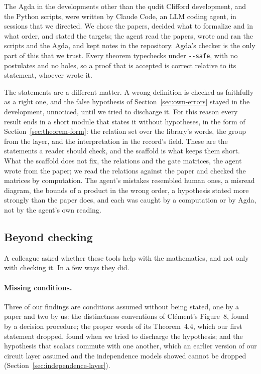 The Agda in the developments other than the qudit Clifford development,
and the Python scripts, were written by Claude Code, an LLM coding
agent, in sessions that we directed. We chose the papers, decided what
to formalize and in what order, and stated the targets; the agent read
the papers, wrote and ran the scripts and the Agda, and kept notes in
the repository. Agda's checker is the only part of this that we trust.
Every theorem typechecks under \texttt{-{}-safe}, with no postulates
and no holes, so a proof that is accepted is correct relative to its
statement, whoever wrote it.

The statements are a different matter. A wrong definition is checked
as faithfully as a right one, and the false hypothesis of
Section~\ref{sec:own-errors} stayed in the development, unnoticed, until
we tried to discharge it. For this reason every result ends in a short
module that states it without hypotheses, in the form of
Section~\ref{sec:theorem-form}: the relation set over the library's
words, the group from the layer, and the interpretation in the
record's field. These are the statements a reader should check, and
the scaffold is what keeps them short. What the scaffold does not fix,
the relations and the gate matrices, the agent wrote from the paper;
we read the relations against the paper and checked the matrices by
computation. The agent's
mistakes resembled human ones, a misread diagram, the bounds of a
product in the wrong order, a hypothesis stated more strongly than the
paper does, and each was caught by a computation or by Agda, not by
the agent's own reading.

\subsection{Beyond checking}\label{sec:beyond}

A colleague asked whether these tools help with the mathematics, and
not only with checking it. In a few ways they did.

\paragraph{Missing conditions.} Three of our findings are conditions
assumed without being stated, one by a paper and two by us: the
distinctness conventions of Cl\'ement's Figure~8, found by a decision
procedure; the proper words of its Theorem~4.4, which our first
statement dropped, found when we tried to discharge the hypothesis;
and the hypothesis that scalars commute with one another, which an
earlier version of our circuit layer assumed and the independence
models showed cannot be dropped (Section~\ref{sec:independence-layer}).

